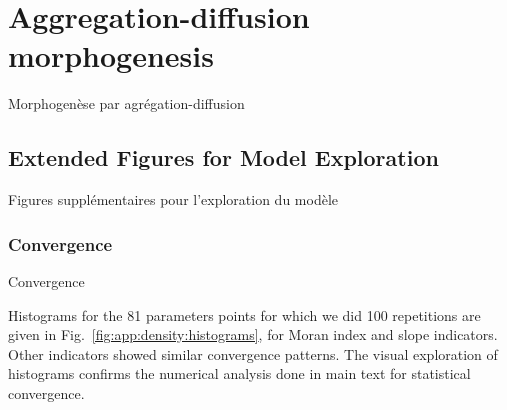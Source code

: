 





\newpage

\section{Aggregation-diffusion morphogenesis}{Morphogenèse par agrégation-diffusion}

\label{app:sec:density}




\subsection{Extended Figures for Model Exploration}{Figures supplémentaires pour l'exploration du modèle}


\subsubsection{Convergence}{Convergence}

Histograms for the 81 parameters points for which we did 100 repetitions are given in Fig.~\ref{fig:app:density:histograms}, for Moran index and slope indicators. Other indicators showed similar convergence patterns. The visual exploration of histograms confirms the numerical analysis done in main text for statistical convergence.





